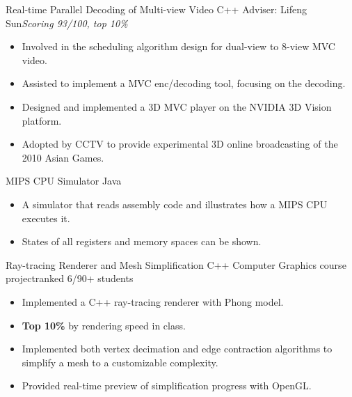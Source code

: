 \documentclass[10pt,a4paper]{moderncv/moderncv}
\begin{document}
{Real-time Parallel Decoding of Multi-view Video}
{C++}
{Adviser: Lifeng Sun}{\textit{Scoring 93/100, top 10\%}}
{
\begin{itemize}
	\item Involved in the scheduling algorithm design for dual-view to 8-view MVC video.
	\item Assisted to implement a MVC enc/decoding tool, focusing on the decoding.
	\item Designed and implemented a 3D MVC player on the NVIDIA 3D Vision platform.
	\item Adopted by CCTV to provide experimental 3D online broadcasting of the 2010 Asian Games.
\end{itemize}
}

{MIPS CPU Simulator}
{Java}
{}{}
{
\begin{itemize}
	\item A simulator that reads assembly code and illustrates how a MIPS CPU executes it.
	\item States of all registers and memory spaces can be shown.
\end{itemize}
}


{Ray-tracing Renderer and Mesh Simplification}
{C++}
{Computer Graphics course project}{ranked 6/90+ students}
{{
\begin{itemize}
	\item Implemented a C++ ray-tracing renderer with Phong model.
	\item \textbf{Top 10\%} by rendering speed in class.
	\item Implemented both vertex decimation and edge contraction algorithms to simplify a mesh to a customizable complexity.
	\item Provided real-time preview of simplification progress with OpenGL.
\end{itemize}}
}
\end{document}

